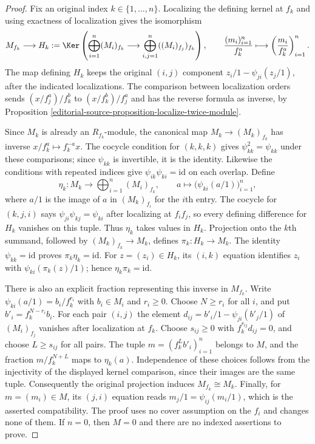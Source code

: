 \begin{proof}
Fix an original index $k\in\{1,\ldots,n\}$.
Localizing the defining kernel at $f_k$ and using exactness of
localization gives the isomorphism
$$
M_{f_k}\longrightarrow H_k:=
\Ker\left(
\bigoplus_{i=1}^n(M_i)_{f_k}\longrightarrow
\bigoplus_{i,j=1}^n((M_i)_{f_j})_{f_k}
\right),\qquad
\frac{(m_i)_{i=1}^n}{f_k^a}\longmapsto
\left(\frac{m_i}{f_k^a}\right)_{i=1}^n.
$$
The map defining $H_k$ keeps the original $(i,j)$ component
$z_i/1-\psi_{ji}(z_j/1)$, after the indicated localizations.
The comparison between localization orders sends
$(x/f_j^a)/f_k^b$ to $(x/f_k^b)/f_j^a$ and has the reverse
formula as inverse, by Proposition \ref{editorial-source-proposition-localize-twice-module}.

\medskip\noindent
Since $M_k$ is already an $R_{f_k}$-module, the canonical map
$M_k\to(M_k)_{f_k}$ has inverse
$x/f_k^a\mapsto f_k^{-a}x$.
The cocycle condition for $(k,k,k)$ gives $\psi_{kk}^2=\psi_{kk}$
under these comparisons; since $\psi_{kk}$ is invertible, it is the
identity. Likewise the conditions with repeated indices give
$\psi_{ik}\psi_{ki}=\mathrm{id}$ on each overlap.
Define
$$
\eta_k:M_k\longrightarrow\bigoplus_{i=1}^n(M_i)_{f_k},\qquad
a\longmapsto\bigl(\psi_{ki}(a/1)\bigr)_{i=1}^n,
$$
where $a/1$ is the image of $a$ in $(M_k)_{f_i}$ for the $i$th entry.
The cocycle for $(k,j,i)$ says
$\psi_{ji}\psi_{kj}=\psi_{ki}$ after localizing at $f_if_j$,
so every defining difference for $H_k$ vanishes on this tuple.
Thus $\eta_k$ takes values in $H_k$.
Projection onto the $k$th summand, followed by
$(M_k)_{f_k}\to M_k$, defines $\pi_k:H_k\to M_k$.
The identity $\psi_{kk}=\mathrm{id}$ proves $\pi_k\eta_k=\mathrm{id}$.
For $z=(z_i)\in H_k$, its $(i,k)$ equation identifies $z_i$
with $\psi_{ki}(\pi_k(z)/1)$; hence $\eta_k\pi_k=\mathrm{id}$.

\medskip\noindent
There is also an explicit fraction representing this inverse in $M_{f_k}$.
Write $\psi_{ki}(a/1)=b_i/f_k^{r_i}$ with $b_i\in M_i$ and $r_i\geq0$.
Choose $N\geq r_i$ for all $i$, and put $b'_i=f_k^{N-r_i}b_i$.
For each pair $(i,j)$ the element
$d_{ij}=b'_i/1-\psi_{ji}(b'_j/1)$ of $(M_i)_{f_j}$
vanishes after localization at $f_k$.
Choose $s_{ij}\geq0$ with $f_k^{s_{ij}}d_{ij}=0$, and choose
$L\geq s_{ij}$ for all pairs. The tuple
$m=(f_k^Lb'_i)_{i=1}^n$ belongs to $M$, and the fraction
$m/f_k^{N+L}$ maps to $\eta_k(a)$.
Independence of these choices follows from the injectivity of the
displayed kernel comparison, since their images are the same tuple.
Consequently the original projection induces $M_{f_k}\cong M_k$.
Finally, for $m=(m_i)\in M$, its $(j,i)$ equation reads
$m_j/1=\psi_{ij}(m_i/1)$, which is the asserted compatibility.
The proof uses no cover assumption on the $f_i$ and changes none of them.
If $n=0$, then $M=0$ and there are no indexed assertions to prove.
\end{proof}


